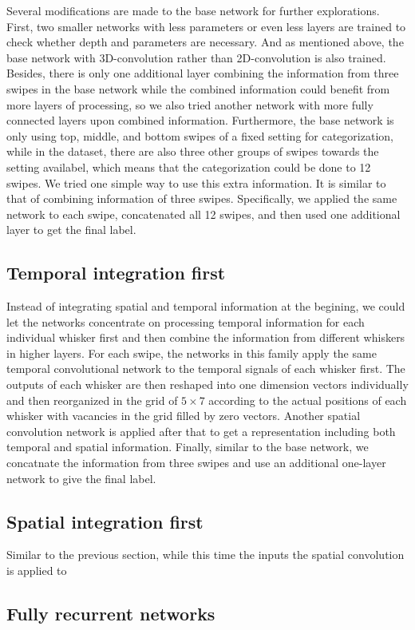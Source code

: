Several modifications are made to the base network for further explorations. First, two smaller networks with less parameters or even less layers are trained to check whether depth and parameters are necessary.
And as mentioned above, the base network with 3D-convolution rather than 2D-convolution is also trained.
Besides, there is only one additional layer combining the information from three swipes in the base network while the combined information could benefit from more layers of processing, so we also tried another network with more fully connected layers upon combined information.
Furthermore, the base network is only using top, middle, and bottom swipes of a fixed setting for categorization, while in the dataset, there are also three other groups of swipes towards the setting availabel, which means that the categorization could be done to 12 swipes. 
We tried one simple way to use this extra information. It is similar to that of combining information of three swipes. Specifically, we applied the same network to each swipe, concatenated all 12 swipes, and then used one additional layer to get the final label.


\subsection{Temporal integration first}

Instead of integrating spatial and temporal information at the begining, we could let the networks concentrate on processing temporal information for each individual whisker first and then combine the information from different whiskers in higher layers.
For each swipe, the networks in this family apply the same temporal convolutional network to the temporal signals of each whisker first. 
The outputs of each whisker are then reshaped into one dimension vectors individually and then reorganized in the grid of $5\times7$ according to the actual positions of each whisker with vacancies in the grid filled by zero vectors. 
Another spatial convolution network is applied after that to get a representation including both temporal and spatial information.
Finally, similar to the base network, we concatnate the information from three swipes and use an additional one-layer network to give the final label.

\subsection{Spatial integration first}

Similar to the previous section, while this time the inputs the spatial convolution is applied to 


\subsection{Fully recurrent networks}
